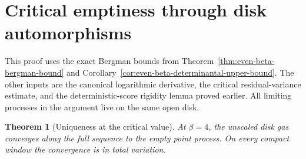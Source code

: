 \documentclass[11pt,a4paper]{article}
\numberwithin{equation}{section}
\newtheorem{theorem}{Theorem}[section]
\theoremstyle{definition}
\theoremstyle{remark}
\begin{document}
\section{Critical emptiness through disk automorphisms}
\label{sec:critical-mobius-empty}

This proof uses the exact Bergman bounds from
Theorem~\ref{thm:even-beta-bergman-bound} and
Corollary~\ref{cor:even-beta-determinantal-upper-bound}. The other inputs
are the canonical logarithmic derivative, the critical residual-variance
estimate, and the deterministic-score rigidity lemma proved earlier.
All limiting processes in the argument live on the same open disk.

\begin{theorem}[Uniqueness at the critical value]
\label{thm:critical-mobius-empty}
At $\beta=4$, the unscaled disk gas converges along the full sequence to
the empty point process. On every compact window the convergence is in
total variation.
\end{theorem}
\end{document}
